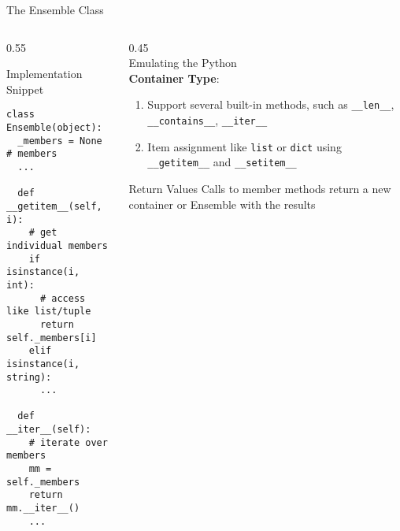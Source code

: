 \documentclass[hyperref={pdfpagelabels=false},compress,final]{beamer}
\newenvironment{myBox}[3][shadow=true]%
{\begin{center} \begin{minipage}{#2} \begin{beamerboxesrounded}[#1]{#3} \smallskip}%
      {\smallskip \end{beamerboxesrounded} \end{minipage} \end{center}}
\begin{document}
\begin{frame}[fragile=singleslide]{\hspace*{0.65\textwidth}The Ensemble Class}
  \begin{columns}
    \begin{column}{0.55\textwidth}
      \vspace*{-1.cm}
      \begin{myBox}{1.\textwidth}{Implementation Snippet}
        \small
        \begin{verbatim}
class Ensemble(object):
  _members = None # members
  ...
  
  def __getitem__(self, i):
    # get individual members
    if isinstance(i, int):
      # access like list/tuple 
      return self._members[i]
    elif isinstance(i, string):
      ...
      
  def __iter__(self):
    # iterate over members
    mm = self._members
    return mm.__iter__()
    ...
    
        \end{verbatim}
      \end{myBox}
    \end{column}
    \begin{column}{0.45\textwidth}
      \medskip \\
      { \large Emulating the Python \\ \smallskip \textbf{\color{darkred} Container Type}:} \\ 
      \small
      \begin{enumerate}
        \item Support several built-in methods, such as \texttt{\_\_len\_\_}, \texttt{\_\_contains\_\_}, \texttt{\_\_iter\_\_} \medskip
        \item Item assignment like \texttt{list} or \texttt{dict} using \texttt{\_\_getitem\_\_} and \texttt{\_\_setitem\_\_}\medskip
      \end{enumerate}
      \begin{myBox}{0.85\textwidth}{Return Values}
        Calls to member methods return a new container or Ensemble with the results
       \end{myBox}
    \end{column}
  \end{columns}
\end{frame}
\end{document}
